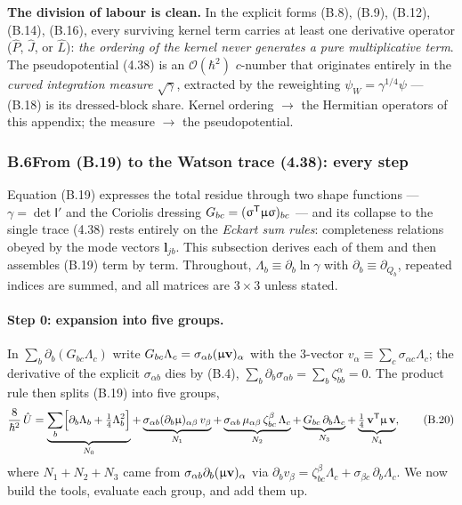 \textbf{The division of labour is clean.} In the explicit forms (B.8), (B.9), (B.12), (B.14), (B.16), every surviving kernel term carries at least one derivative operator ($\hat P$, $\hat J$, or $\hat L$): \emph{the ordering of the kernel never generates a pure multiplicative term}. The pseudopotential (4.38) is an $\mathcal O(\hbar^2)$ $c$-number that originates entirely in the \emph{curved integration measure} $\sqrt\gamma$, extracted by the reweighting $\psi_W=\gamma^{1/4}\psi$ --- (B.18) is its dressed-block share. Kernel ordering $\rightarrow$ the Hermitian operators of this appendix; the measure $\rightarrow$ the pseudopotential.

\subsubsection*{B.6\quad From (B.19) to the Watson trace (4.38): every step}

Equation (B.19) expresses the total residue through two shape functions --- $\gamma=\det\mathsf I'$ and the Coriolis dressing $G_{bc}=(\upsigma^{\mathsf T}\upmu\upsigma)_{bc}$ --- and its collapse to the single trace (4.38) rests entirely on the \emph{Eckart sum rules}: completeness relations obeyed by the mode vectors $\mathbf l_{jb}$. This subsection derives each of them and then assembles (B.19) term by term. Throughout, $\Lambda_b\equiv\partial_{b}\ln\gamma$ with $\partial_b\equiv\partial_{Q_b}$, repeated indices are summed, and all matrices are $3\times3$ unless stated.

\paragraph{Step 0: expansion into five groups.}
In $\sum_{b}\partial_b(G_{bc}\Lambda_c)$ write $G_{bc}\Lambda_c=\sigma_{\alpha b}(\upmu\mathbf v)_\alpha$ with the 3-vector $v_\alpha\equiv\sum_c\sigma_{\alpha c}\Lambda_c$; the derivative of the explicit $\sigma_{\alpha b}$ dies by (B.4), $\sum_b\partial_b\sigma_{\alpha b}=\sum_b\zeta^\alpha_{bb}=0$. The product rule then splits (B.19) into five groups,
\begin{equation}
\frac{8}{\hbar^{2}}\,\hat U
=\underbrace{\sum_b\Bigl[\partial_b\Lambda_b+\tfrac14\Lambda_b^2\Bigr]}_{N_{0}}
+\underbrace{\sigma_{\alpha b}(\partial_b\upmu)_{\alpha\beta}\,v_\beta}_{N_{1}}
+\underbrace{\sigma_{\alpha b}\,\mu_{\alpha\beta}\,\zeta^{\beta}_{bc}\,\Lambda_c}_{N_{2}}
+\underbrace{G_{bc}\,\partial_b\Lambda_c}_{N_{3}}
+\underbrace{\tfrac14\,\mathbf v^{\mathsf T}\upmu\,\mathbf v}_{N_{4}} , \tag{B.20}
\end{equation}
where $N_1+N_2+N_3$ came from $\sigma_{\alpha b}\partial_b(\upmu\mathbf v)_\alpha$ via $\partial_b v_\beta=\zeta^{\beta}_{bc}\Lambda_c+\sigma_{\beta c}\,\partial_b\Lambda_c$. We now build the tools, evaluate each group, and add them up.

